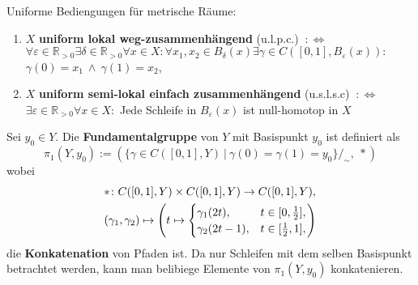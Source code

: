 \documentclass[12pt, aspectratio=169]{beamer}
\newcommand{\R}[0]{\mathbb{R}}
\begin{document}
\begin{frame}
Uniforme Bediengungen für metrische Räume:    
\begin{definition}
    \begin{enumerate}
        \item $X$ \textbf{uniform lokal weg-zusammenhängend} (u.l.p.c.) $\: :\Longleftrightarrow$ \\ $\forall \varepsilon \in \R_{>0} \exists \delta \in \R_{>0}\forall x \in X\colon \forall x_1, x_2 \in B_{\delta}(x)\exists \gamma \in C([0,1], B_{\varepsilon}(x))\colon$ \\ $\gamma(0) = x_1 \: \land \: \gamma(1) = x_2$,
        \item $X$ \textbf{uniform semi-lokal einfach zusammenhängend} (u.s.l.s.c) $\: :\Longleftrightarrow$ \\ $\exists \varepsilon \in \R_{>0}\forall x\in X\colon$ Jede Schleife in $B_{\varepsilon}(x)$ ist null-homotop in $X$
        \end{enumerate}
\end{definition}
\end{frame}

\begin{frame}
    \begin{definition}
         {
            Sei $y_0 \in Y$. Die \textbf{Fundamentalgruppe} von $Y$ mit Basispunkt $y_0$ ist definiert als
            \begin{equation*}
            \pi_1(Y, y_0) := (\{\gamma \in C([0,1],Y) \: | \: \gamma(0) = \gamma(1) = y_0\}/_{\sim}, \: *)
            \end{equation*}
        }
         {
        wobei 
        \begin{align*} 
          &*\colon C([0,1], Y) \times C([0,1], Y) \to C([0,1], Y), \\
          &(\gamma_1, \gamma_2) \mapsto \left(t \mapsto \begin{cases}
          \gamma_1(2t),   &t \in [0, {1 \over 2}], \\
          \gamma_2(2t-1), &t \in [{1 \over 2}, 1],
            \end{cases}\right)
        \end{align*}
        die \textbf{Konkatenation} von Pfaden ist. 
        Da nur Schleifen mit dem selben Basispunkt betrachtet werden, kann man belibiege Elemente von $\pi_1(Y, y_0)$ konkatenieren.
        }    
    \end{definition}
\end{frame}
\end{document}
